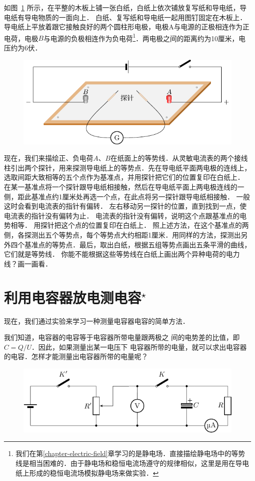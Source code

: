 如图~\ref{fig_B_9-5} 所示，在平整的木板上铺一张白纸，白纸上依次铺放复写纸和导电纸，导电纸有导电物质的一面向上．
白纸、复写纸和导电纸一起用图钉固定在木板上．
导电纸上平放着跟它接触良好的两个圆柱形电极，电极A与电源的正极相连作为正电荷，电极$B$与电源的负极相连作为负电荷\footnote{我们在第\ref{chapter-electric-field}章学习的是静电场．直接描绘静电场中的等势线是相当困难的．由于静电场和稳恒电流场遵守的规律相似，这里是用在导电纸上形成的稳恒电流场模拟静电场来做实验．}．两电极之间的距离约为10厘米，电压约为6伏．
\begin{figure}[htbp]
    \centering
    \includegraphics{fig/B/9-5.pdf}
    \caption{}\label{fig_B_9-5}
\end{figure}

现在，我们来描绘正、负电荷$A$、$B$在纸面上的等势线．从灵敏电流表的两个接线柱引出两个探针，用来探测导电纸上的等势点．先在导电纸平面两电极的连线上，选取间距大致相等的五个点作为基准点，并用探针把它们的位置复印在白纸上．
在某一基准点将一个探针跟导电纸相接触，然后在导电纸平面上两电极连线的一侧，距此基准点约1厘米处再选一个点，在此点将另一探针跟导电纸相接触．
一般这时会看到电流表的指针有偏转．
左右移动另一探针的位置，直到找到一点，使电流表的指针没有偏转为止．
电流表的指针没有偏转，说明这个点跟基准点的电势相等．
用探针把这个点的位置复印在白纸上．
照上述方法，在这个基准点的两侧，各探测出五个等势点，每个等势点大约相距1厘米．用同样的方法，探测出另外四个基准点的等势点．最后，取出白纸，根据五组等势点画出五条平滑的曲线，它们就是等势线．
你能不能根据这些等势线在白纸上画出两个异种电荷的电力线？画一画看．

\section{利用电容器放电测电容$^\star$}
现在，我们通过实验来学习一种测量电容器电容的简单方法．

我们知道，电容器的电容等于电容器所带电量跟两极之
间的电势差的比值，即$C=Q/U$．因此，如果测量出某一电压下
电容器所带的电量，就可以求出电容器的电容．怎样才能测量出电容器所带的电量呢？
\begin{figure}[htbp]
    \centering
    \includegraphics{fig/B/9-6.pdf}
    \caption{}\label{fig_B_9-6}
\end{figure}

